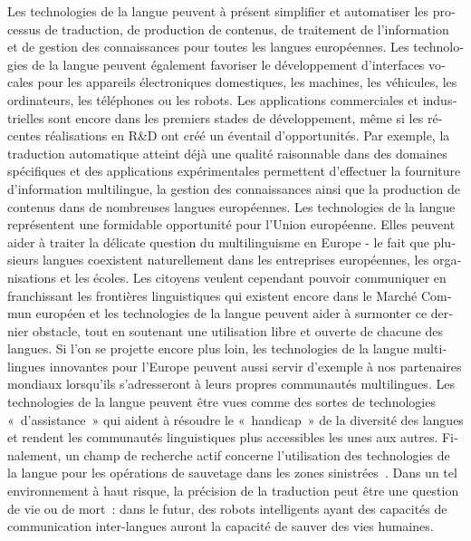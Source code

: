 \begin{french}
\begin{multicols}{2}
Les technologies de la langue peuvent à présent simplifier et
automatiser les processus de traduction, de production de contenus, de
traitement de l'information et de gestion des connaissances
pour toutes les langues européennes. Les technologies de la langue
peuvent également favoriser le développement d'interfaces
vocales pour les appareils électroniques domestiques, les machines,
les véhicules, les ordinateurs, les téléphones ou les robots. Les applications
commerciales et industrielles sont encore dans les premiers stades de
développement, même si les récentes réalisations en R\&D ont créé un
éventail d'opportunités. Par exemple, la traduction
automatique atteint déjà une qualité raisonnable dans des domaines
spécifiques et des applications expérimentales permettent d'effectuer la fourniture d'information multilingue, la
gestion des connaissances ainsi que la production de contenus dans de
nombreuses langues européennes.
Les technologies de la langue représentent une formidable opportunité
pour l'Union européenne. Elles peuvent aider à traiter la
délicate question du multilinguisme en Europe - le fait que plusieurs
langues coexistent naturellement dans les entreprises européennes, les
organisations et les écoles. Les citoyens veulent cependant pouvoir
communiquer en franchissant les frontières linguistiques qui existent
encore dans le Marché Commun européen et les technologies de la langue
peuvent aider à surmonter ce dernier obstacle, tout en soutenant une
utilisation libre et ouverte de chacune des langues. Si l'on
se projette encore plus loin, les technologies de la langue
multilingues innovantes pour l'Europe peuvent aussi servir
d'exemple à nos partenaires mondiaux lorsqu'ils
s'adresseront à leurs propres communautés multilingues. Les
technologies de la langue peuvent être vues comme des sortes de
technologies «~d'assistance~» qui aident à résoudre le
«~handicap~» de la diversité des langues et rendent les communautés
linguistiques plus accessibles les unes aux autres. Finalement, un
champ de recherche actif concerne l'utilisation des
technologies de la langue pour les opérations de sauvetage dans les
zones sinistrées~\cite{resnick2011}. Dans un tel environnement à haut
risque, la précision de la traduction peut être une question de vie ou
de mort~: dans le futur, des robots intelligents ayant des capacités
de communication inter-langues auront la capacité de sauver des vies
humaines.


\end{multicols}
\end{french}
